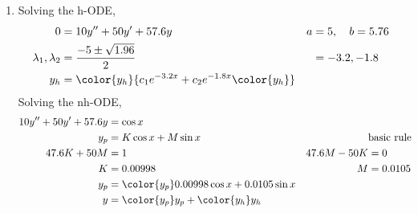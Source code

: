 \begin{enumerate}
    \item Solving the h-ODE,
          \begin{align}
              0                        & = 10y'' + 50y' + 57.6y                &
              a                        & = 5, \quad b = 5.76                     \\
              \lambda_{1}, \lambda_{2} & = \frac{-5 \pm \sqrt{1.96}}{2}        &
                                       & = -3.2, -1.8                            \\
              y_{h}                    & = \color{y_h} {c_{1}e^{-3.2x} + c_{2}
              e^{-1.8x} \color{y_h}}
          \end{align}
          Solving the nh-ODE,
          \begin{align}
              10y'' + 50y' + 57.6y & = \cos x                                      \\
              y_{p}                & = K\cos x + M\sin x                         &
                                   & \text{basic rule}                             \\
              47.6K + 50M          & = 1                                         &
              47.6M - 50K          & = 0                                           \\
              K                    & = 0.00998                                   &
              M                    & =  0.0105                                     \\
              y_{p}                & = \color{y_p} 0.00998\cos x + 0.0105 \sin x   \\
              y                    & = {\color{y_p} y_{p}} + {\color{y_h} y_{h}}
          \end{align}


\end{enumerate}
